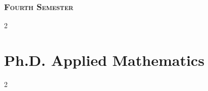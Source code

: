\documentclass[12pt]{article}
\newcommand{\cols}{2}
\begin{document}
\section{\scshape  Fourth Semester}
\vspace{-0.2cm}
\begin{multicols}{\cols}
\end{multicols}
\newpage
\part{\normalsize Ph.D. Applied Mathematics}
\begin{multicols}{\cols}
\end{multicols}

\newpage
{}
\end{document}
